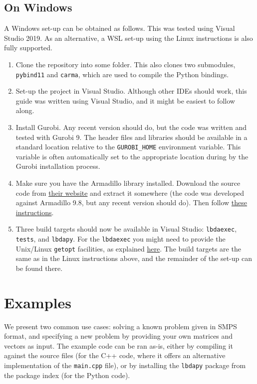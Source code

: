 \documentclass[12pt, english]{article}
\begin{document}
\subsection{On Windows}
A Windows set-up can be obtained as follows. This was tested using Visual Studio 2019. As an alternative, a WSL set-up using the Linux instructions is also fully supported.

\begin{enumerate}
	\item Clone the repository into some folder. This also clones two submodules, \texttt{pybind11} and \texttt{carma}, which are used to compile the Python bindings.
	
	\item Set-up the project in Visual Studio. Although other IDEs should work, this guide was written using Visual Studio, and it might be easiest to follow along.
	
	\item Install Gurobi. Any recent version should do, but the code was written and tested with Gurobi 9. The header files and libraries should be available in a standard location relative to the \texttt{GUROBI\_HOME} environment variable. This variable is often automatically set to the  appropriate location during by the Gurobi installation process.
	
	\item Make sure you have the Armadillo library installed. Download the source code from \href{http://arma.sourceforge.net/download.html}{their website} and extract it somewhere (the code was developed against Armadillo 9.8, but any recent version should do). Then follow \href{https://stackoverflow.com/a/44659049/4316405}{these instructions}.
	
	\item Three build targets should now be available in Visual Studio: \texttt{lbdaexec}, \texttt{tests}, and \texttt{lbdapy}. For the \texttt{lbdaexec} you might need to provide the Unix/Linux \texttt{getopt} facilities, as explained \href{https://stackoverflow.com/a/17195644/4316405}{here}. The build targets are the same as in the Linux instructions above, and the remainder of the set-up can be found there.
\end{enumerate}

\section{Examples}
\label{sec:examples}

We present two common use cases: solving a known problem given in SMPS format, and specifying a new problem by providing your own matrices and vectors as input. The example code can be ran as-is, either by compiling it against the source files (for the C++ code, where it offers an alternative implementation of the \texttt{main.cpp} file), or by installing the \texttt{lbdapy} package from the package index (for the Python code).
\end{document}

